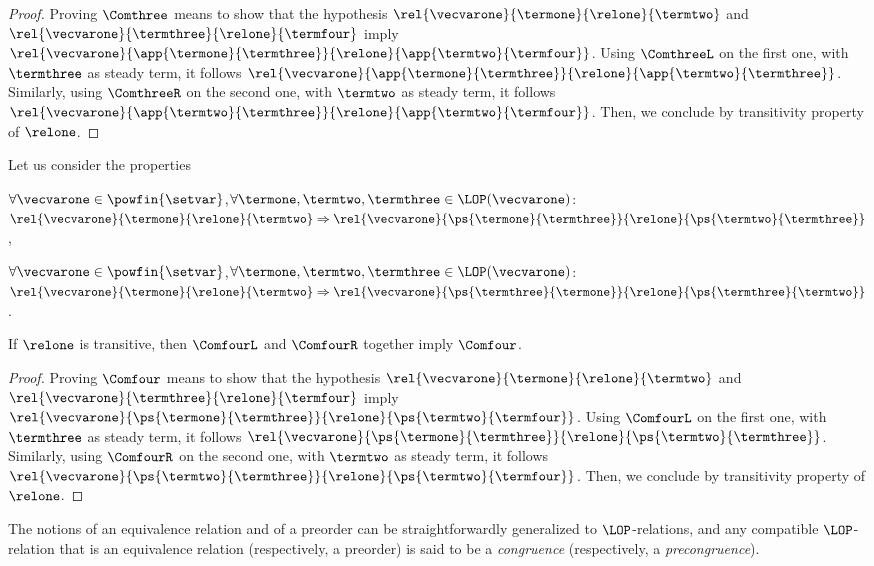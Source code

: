 \begin{proof}
  Proving $\Comthree$ means to show that the hypothesis
  $\rel{\vecvarone}{\termone}{\relone}{\termtwo}$ and
  $\rel{\vecvarone}{\termthree}{\relone}{\termfour}$ imply
  $\rel{\vecvarone}{\app{\termone}{\termthree}}{\relone}{\app{\termtwo}{\termfour}}$. Using
  $\ComthreeL$ on the first one, with $\termthree$ as steady term, it
  follows
  $\rel{\vecvarone}{\app{\termone}{\termthree}}{\relone}{\app{\termtwo}{\termthree}}$. Similarly,
  using $\ComthreeR$ on the second one, with $\termtwo$ as steady term, it
  follows
  $\rel{\vecvarone}{\app{\termtwo}{\termthree}}{\relone}{\app{\termtwo}{\termfour}}$. Then,
  we conclude by transitivity property of $\relone$.
\end{proof}

\begin{lemma}\label{lemma:com4LR}
  Let us consider the properties
  \begin{varitemize}
  \item[\ComfourL]
    $\forall\vecvarone\in\powfin{\setvar}$,$\forall\termone,\termtwo,\termthree\in\LOP(\vecvarone)$:
    $\rel{\vecvarone}{\termone}{\relone}{\termtwo}\Rightarrow
    \rel{\vecvarone}{\ps{\termone}{\termthree}}{\relone}{\ps{\termtwo}{\termthree}}$,
  \item[\ComfourR]
    $\forall\vecvarone\in\powfin{\setvar}$,$\forall\termone,\termtwo,\termthree\in\LOP(\vecvarone)$:
    $\rel{\vecvarone}{\termone}{\relone}{\termtwo}\Rightarrow
    \rel{\vecvarone}{\ps{\termthree}{\termone}}{\relone}{\ps{\termthree}{\termtwo}}$.
  \end{varitemize}
  If $\relone$ is transitive, then $\ComfourL$ and $\ComfourR$ together imply $\Comfour$.
\end{lemma}
\begin{proof}
  Proving $\Comfour$ means to show that the hypothesis
  $\rel{\vecvarone}{\termone}{\relone}{\termtwo}$ and
  $\rel{\vecvarone}{\termthree}{\relone}{\termfour}$ imply
  $\rel{\vecvarone}{\ps{\termone}{\termthree}}{\relone}{\ps{\termtwo}{\termfour}}$. Using
  $\ComfourL$ on the first one, with $\termthree$ as steady term, it
  follows
  $\rel{\vecvarone}{\ps{\termone}{\termthree}}{\relone}{\ps{\termtwo}{\termthree}}$. Similarly,
  using $\ComfourR$ on the second one, with $\termtwo$ as steady term, it
  follows
  $\rel{\vecvarone}{\ps{\termtwo}{\termthree}}{\relone}{\ps{\termtwo}{\termfour}}$. Then,
  we conclude by transitivity property of $\relone$.
\end{proof}
The notions of an equivalence relation and of a preorder can be straightforwardly generalized to $\LOP$-relations, and
any compatible $\LOP$-relation that is an equivalence relation (respectively, a preorder) is said to be a \emph{congruence} 
(respectively, a \emph{precongruence}).

